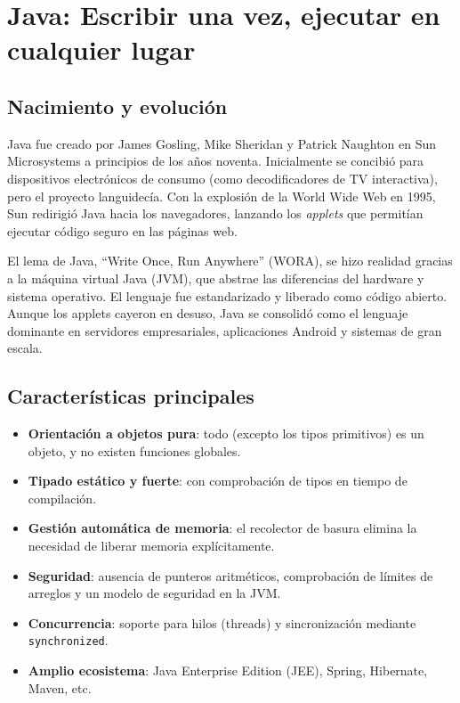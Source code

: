 \section{Java: Escribir una vez, ejecutar en cualquier lugar}

\subsection{Nacimiento y evolución}

Java fue creado por James Gosling, Mike Sheridan y Patrick Naughton en Sun Microsystems a principios de los años noventa. Inicialmente se concibió para dispositivos electrónicos de consumo (como decodificadores de TV interactiva), pero el proyecto languidecía. Con la explosión de la World Wide Web en 1995, Sun redirigió Java hacia los navegadores, lanzando los \textit{applets} que permitían ejecutar código seguro en las páginas web.

El lema de Java, ``Write Once, Run Anywhere'' (WORA), se hizo realidad gracias a la máquina virtual Java (JVM), que abstrae las diferencias del hardware y sistema operativo. El lenguaje fue estandarizado y liberado como código abierto. Aunque los applets cayeron en desuso, Java se consolidó como el lenguaje dominante en servidores empresariales, aplicaciones Android y sistemas de gran escala.

\subsection{Características principales}

\begin{itemize}
  \item \textbf{Orientación a objetos pura}: todo (excepto los tipos primitivos) es un objeto, y no existen funciones globales.
  \item \textbf{Tipado estático y fuerte}: con comprobación de tipos en tiempo de compilación.
  \item \textbf{Gestión automática de memoria}: el recolector de basura elimina la necesidad de liberar memoria explícitamente.
  \item \textbf{Seguridad}: ausencia de punteros aritméticos, comprobación de límites de arreglos y un modelo de seguridad en la JVM.
  \item \textbf{Concurrencia}: soporte para hilos (threads) y sincronización mediante \texttt{synchronized}.
  \item \textbf{Amplio ecosistema}: Java Enterprise Edition (JEE), Spring, Hibernate, Maven, etc.
\end{itemize}

